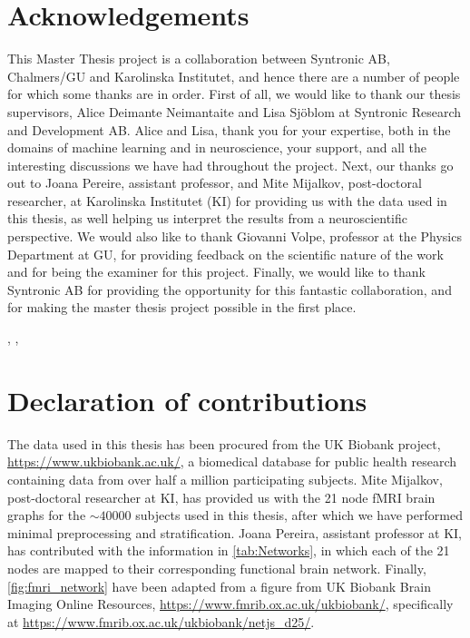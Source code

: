 \thispagestyle{plain}			%
\section*{Acknowledgements}
This Master Thesis project is a collaboration between Syntronic AB, Chalmers/GU and Karolinska Institutet, and hence there are a number of people for which some thanks are in order. First of all, we would like to thank our thesis supervisors, Alice Deimante Neimantaite and Lisa Sjöblom at Syntronic Research and Development AB. Alice and Lisa, thank you for your expertise, both in the domains of machine learning and in neuroscience, your support, and all the interesting discussions we have had throughout the project. Next, our thanks go out to Joana Pereire, assistant professor, and Mite Mijalkov, post-doctoral researcher, at Karolinska Institutet (KI) for providing us with the data used in this thesis, as well helping us interpret the results from a neuroscientific perspective. We would also like to thank Giovanni Volpe, professor at the Physics Department at GU, for providing feedback on the scientific nature of the work and for being the examiner for this project. Finally, we would like to thank Syntronic AB for providing the opportunity for this fantastic collaboration, and for making the master thesis project possible in the first place.

\hfill
\thesisAuthor, \thesisCity, \thesisMonth\ \thesisYear

\section*{Declaration of contributions}
The data used in this thesis has been procured from the UK Biobank project, \url{https://www.ukbiobank.ac.uk/}, a biomedical database for public health research containing data from over half a million participating subjects. Mite Mijalkov, post-doctoral researcher at KI, has provided us with the 21 node fMRI brain graphs for the $\sim 40000$ subjects used in this thesis, after which we have performed minimal preprocessing and stratification. Joana Pereira, assistant professor at KI, has contributed with the information in \cref{tab:Networks}, in which each of the 21 nodes are mapped to their corresponding functional brain network. Finally, \cref{fig:fmri_network} have been adapted from a figure from UK Biobank Brain Imaging Online Resources, \url{https://www.fmrib.ox.ac.uk/ukbiobank/}, specifically at \url{https://www.fmrib.ox.ac.uk/ukbiobank/netjs_d25/}. 

\if{}
\newpage				%
\thispagestyle{empty}
\mbox{}
\fi
